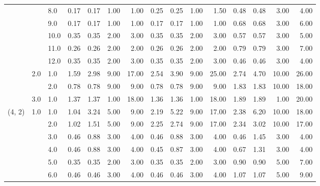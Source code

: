 \begin{tabular}{lllrrrrrrrrrrrr}
       &     & 8.0  &       0.17 &      0.17 & 1.00 &   1.00 &       0.25 &      0.25 &  1.00 &   1.50 &       0.48 &      0.48 &  3.00 &   4.00 \\
       &     & 9.0  &       0.17 &      0.17 & 1.00 &   1.00 &       0.17 &      0.17 &  1.00 &   1.00 &       0.68 &      0.68 &  3.00 &   6.00 \\
       &     & 10.0 &       0.35 &      0.35 & 2.00 &   3.00 &       0.35 &      0.35 &  2.00 &   3.00 &       0.57 &      0.57 &  3.00 &   5.00 \\
       &     & 11.0 &       0.26 &      0.26 & 2.00 &   2.00 &       0.26 &      0.26 &  2.00 &   2.00 &       0.79 &      0.79 &  3.00 &   7.00 \\
       &     & 12.0 &       0.35 &      0.35 & 2.00 &   3.00 &       0.35 &      0.35 &  2.00 &   3.00 &       0.46 &      0.46 &  3.00 &   4.00 \\
       & 2.0 & 1.0  &       1.59 &      2.98 & 9.00 &  17.00 &       2.54 &      3.90 &  9.00 &  25.00 &       2.74 &      4.70 & 10.00 &  26.00 \\
       &     & 2.0  &       0.78 &      0.78 & 9.00 &   9.00 &       0.78 &      0.78 &  9.00 &   9.00 &       1.83 &      1.83 & 10.00 &  18.00 \\
       & 3.0 & 1.0  &       1.37 &      1.37 & 1.00 &  18.00 &       1.36 &      1.36 &  1.00 &  18.00 &       1.89 &      1.89 &  1.00 &  20.00 \\
(4, 2) & 1.0 & 1.0  &       1.04 &      3.24 & 5.00 &   9.00 &       2.19 &      5.22 &  9.00 &  17.00 &       2.38 &      6.20 & 10.00 &  18.00 \\
       &     & 2.0  &       1.02 &      1.51 & 5.00 &   9.00 &       2.25 &      2.74 &  9.00 &  17.00 &       2.34 &      3.02 & 10.00 &  17.00 \\
       &     & 3.0  &       0.46 &      0.88 & 3.00 &   4.00 &       0.46 &      0.88 &  3.00 &   4.00 &       0.46 &      1.45 &  3.00 &   4.00 \\
       &     & 4.0  &       0.46 &      0.88 & 3.00 &   4.00 &       0.45 &      0.87 &  3.00 &   4.00 &       0.67 &      1.31 &  3.00 &   4.00 \\
       &     & 5.0  &       0.35 &      0.35 & 2.00 &   3.00 &       0.35 &      0.35 &  2.00 &   3.00 &       0.90 &      0.90 &  5.00 &   7.00 \\
       &     & 6.0  &       0.46 &      0.46 & 3.00 &   4.00 &       0.46 &      0.46 &  3.00 &   4.00 &       1.07 &      1.07 &  5.00 &   9.00 \\

\end{tabular}
